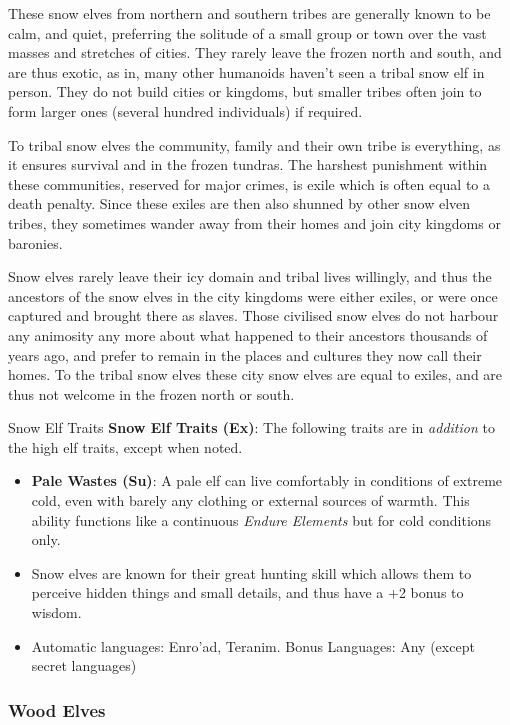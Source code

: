 These snow elves from northern and southern tribes are generally known to be
calm, and quiet, preferring the solitude of a small group or town over the
vast masses and stretches of cities. They rarely leave the frozen north and
south, and are thus exotic, as in, many other humanoids haven't seen a tribal
snow elf in person. They do not build cities or kingdoms, but smaller tribes
often join to form larger ones (several hundred individuals) if required.

To tribal snow elves the community, family and their own tribe is everything, as
it ensures survival and in the frozen tundras. The harshest punishment within
these communities, reserved for major crimes, is exile which is often equal to
a death penalty. Since these exiles are then also shunned by other snow elven
tribes, they sometimes wander away from their homes and join city kingdoms or
baronies.

Snow elves rarely leave their icy domain and tribal lives willingly, and thus
the ancestors of the snow elves in the city kingdoms were either exiles, or
were once captured and brought there as slaves. Those civilised snow elves do
not harbour any animosity any more about what happened to their ancestors
thousands of years ago, and prefer to remain in the places and cultures they
now call their homes. To the tribal snow elves these city snow elves are equal
to exiles, and are thus not welcome in the frozen north or south.

\begin{35e}{Snow Elf Traits}
  \textbf{Snow Elf Traits (Ex)}: The following traits are in \emph{addition}
  to the high elf traits, except when noted.
  \begin{itemize}[noitemsep]
    \item \textbf{Pale Wastes (Su)}: A pale elf can live comfortably in
      conditions of extreme cold, even with barely any clothing or external
      sources of warmth. This ability functions like a continuous \emph{Endure
      Elements} but for cold conditions only.
    \item Snow elves are known for their great hunting skill which allows them
      to perceive hidden things and small details, and thus have a +2 bonus to
      wisdom.
    \item Automatic languages: Enro'ad, Teranim. Bonus Languages: Any (except
      secret languages)
  \end{itemize}
\end{35e}

\subsubsection{Wood Elves}
\label{sec:Wood Elves}

